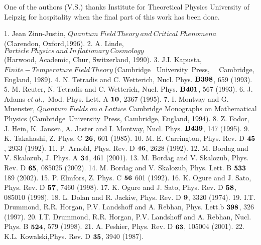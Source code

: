 \documentclass[a4paper,12pt]{article}
\begin{document}
One of the authors (V.S.) thanks Institute for Theoretical Physics
University of Leipzig for hospitality when the final part of this work
has been done.

\begin{thebibliography}{40}

 1. Jean Zinn-Justin, $Quantum~ Field~ Theory~ and~ Critical
 ~ Phenomena~$\\(Clarendon, Oxford,1996).
 2. A. Linde,
  $Particle~Physics~and~Inflationary~Cosmology~$\\
(Harwood, Academic, Chur, Switzerland, 1990).
 3. J.I. Kapusta,
  $Finite-Temperature~Field~Theory~$(Cambridge
~University~Press,~~  Cambridge, England, 1989). 
 4. N. Tetradis and C. Wetterich,
  Nucl. Phys. $\bf{B398}$, 659 (1993).
 5. M. Reuter, N. Tetradis and C. Wetterich,
  Nucl. Phys. $\bf{B401}$, 567 (1993).
 6. J. Adams $et ~al.,$ Mod. Phys. Lett. A $\bf{10}$,
  2367 (1995).
 7. I. Montvay and G. Muenster, $Quantum ~Fields~on~
  a~Lattice$ Cambridge Monographs on Mathematical Physics
  (Cambridge~University~Press, Cambridge, England, 1994).
 8. Z. Fodor, J. Hein, K. Jansen, A. Jaster and
  I. Montvay, Nucl. Phys. $\bf{B439}$, 147 (1995).
 9. K. Takahashi, Z. Phys. C $\bf{26}$, 601 (1985).
 10. M. E. Carrington, Phys. Rev. D $\bf{45}$,
  2933 (1992).
 11. P. Arnold, Phys. Rev. D $\bf{46}$,
  2628 (1992).
 12. M. Bordag and V. Skalozub, J. Phys. A $\bf{34}$,
  461 (2001).
 13. M. Bordag and V. Skalozub, Phys. Rev. D $\bf{65}$,
  085025 (2002).
 14. M. Bordag and V. Skalozub, Phys. Lett. B
  $\bf{533}$ 189 (2002).
 15. P. Elmfors, Z. Phys. C $\bf{56}$ 601 (1992).
 16. K. Ogure and J. Sato, Phys. Rev. D $\bf{57}$, 7460
  (1998).
 17. K. Ogure and J. Sato, Phys. Rev. D $\bf{58}$, 085010
  (1998).
 18. L. Dolan and R. Jackiw,  Phys. Rev. D $\bf{9}$, 3320
  (1974).
 19. I.T. Drummond, R.R. Horgan, P.V. Landshoff and
  A. Rebhan, Phys. Lett.b $\bf{398}$, 326 (1997).
 20. I.T. Drummond, R.R. Horgan, P.V. Landshoff and
  A. Rebhan, Nucl. Phys. B $\bf{524}$, 579 (1998).
 21. A. Peshier, Phys. Rev. D $\bf{63}$, 105004
  (2001).
 22. K.L. Kowalski,Phys. Rev. D $\bf{35}$, 3940
  (1987).
\end{thebibliography}
\end{document}

